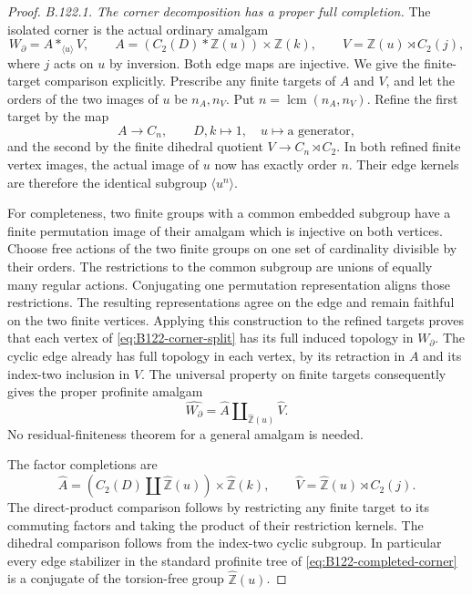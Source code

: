 \begin{proof}
\emph{B.122.1. The corner decomposition has a proper full completion.}
The isolated corner is the actual ordinary amalgam
\begin{equation}\label{eq:B122-corner-split}
 W_{\partial}=A*_{\langle u\rangle}V,\qquad
 A=(C_2(D)*\mathbb Z(u))\times\mathbb Z(k),\qquad
 V=\mathbb Z(u)\rtimes C_2(j),
\end{equation}
where $j$ acts on $u$ by inversion. Both edge maps are injective.
We give the finite-target comparison explicitly. Prescribe any
finite targets of $A$ and $V$, and let the orders of the two
images of $u$ be $n_A,n_V$. Put $n=\operatorname{lcm}(n_A,n_V)$.
Refine the first target by the map
\[
 A\longrightarrow C_n,\qquad D,k\longmapsto1,\quad
 u\longmapsto\text{a generator},
\]
and the second by the finite dihedral quotient
$V\to C_n\rtimes C_2$. In both refined finite vertex images,
the actual image of $u$ now has exactly order $n$. Their edge
kernels are therefore the identical subgroup $\langle u^n\rangle$.

For completeness, two finite groups with a common embedded subgroup
have a finite permutation image of their amalgam which is injective
on both vertices. Choose free actions of the two finite groups on
one set of cardinality divisible by their orders. The restrictions
to the common subgroup are unions of equally many regular actions.
Conjugating one permutation representation aligns those restrictions.
The resulting representations agree on the edge and remain faithful
on the two finite vertices. Applying this construction to the refined
targets proves that each vertex of \eqref{eq:B122-corner-split}
has its full induced topology in $W_{\partial}$. The cyclic edge
already has full topology in each vertex, by its retraction in $A$
and its index-two inclusion in $V$. The universal property on
finite targets consequently gives the proper profinite amalgam
\begin{equation}\label{eq:B122-completed-corner}
 \widehat{W_{\partial}}=
 \widehat A\amalg_{\widehat{\mathbb Z}(u)}\widehat V.
\end{equation}
No residual-finiteness theorem for a general amalgam is needed.

The factor completions are
\[
 \widehat A=(C_2(D)\amalg\widehat{\mathbb Z}(u))
                         \times\widehat{\mathbb Z}(k),
 \qquad
 \widehat V=\widehat{\mathbb Z}(u)\rtimes C_2(j).
\]
The direct-product comparison follows by restricting any finite
target to its commuting factors and taking the product of their
restriction kernels. The dihedral comparison follows from the
index-two cyclic subgroup. In particular every edge stabilizer in
the standard profinite tree of \eqref{eq:B122-completed-corner}
is a conjugate of the torsion-free group
$\widehat{\mathbb Z}(u)$.


\end{proof}
